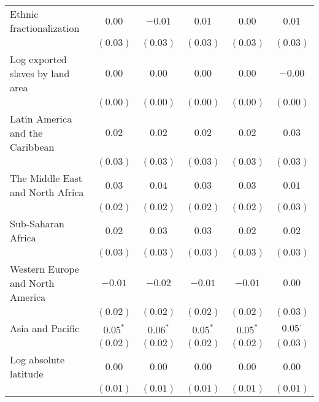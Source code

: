 \begin{table}[H]
\begin{center}
{\begin{tabular}{l c c c c c}
Ethnic fractionalization                               & $0.00$      & $-0.01$     & $0.01$      & $0.00$      & $0.01$         \\
                                                       & $(0.03)$    & $(0.03)$    & $(0.03)$    & $(0.03)$    & $(0.03)$       \\
Log exported slaves by land area                       & $0.00$      & $0.00$      & $0.00$      & $0.00$      & $-0.00$        \\
                                                       & $(0.00)$    & $(0.00)$    & $(0.00)$    & $(0.00)$    & $(0.00)$       \\
Latin America and the Caribbean                        & $0.02$      & $0.02$      & $0.02$      & $0.02$      & $0.03$         \\
                                                       & $(0.03)$    & $(0.03)$    & $(0.03)$    & $(0.03)$    & $(0.03)$       \\
The Middle East and North Africa                       & $0.03$      & $0.04$      & $0.03$      & $0.03$      & $0.01$         \\
                                                       & $(0.02)$    & $(0.02)$    & $(0.02)$    & $(0.02)$    & $(0.03)$       \\
Sub-Saharan Africa                                     & $0.02$      & $0.03$      & $0.03$      & $0.02$      & $0.02$         \\
                                                       & $(0.03)$    & $(0.03)$    & $(0.03)$    & $(0.03)$    & $(0.03)$       \\
Western Europe and North America                       & $-0.01$     & $-0.02$     & $-0.01$     & $-0.01$     & $0.00$         \\
                                                       & $(0.02)$    & $(0.02)$    & $(0.02)$    & $(0.02)$    & $(0.03)$       \\
Asia and Pacific                                       & $0.05^{*}$  & $0.06^{*}$  & $0.05^{*}$  & $0.05^{*}$  & $0.05^{\cdot}$ \\
                                                       & $(0.02)$    & $(0.02)$    & $(0.02)$    & $(0.02)$    & $(0.03)$       \\
Log absolute latitude                                  & $0.00$      & $0.00$      & $0.00$      & $0.00$      & $0.00$         \\
                                                       & $(0.01)$    & $(0.01)$    & $(0.01)$    & $(0.01)$    & $(0.01)$       \\

\end{tabular}}
\end{center}
\end{table}
